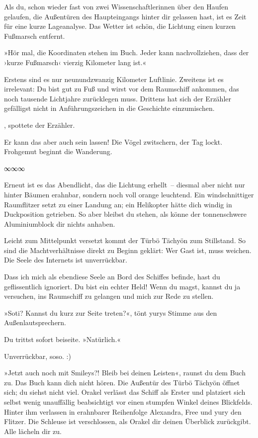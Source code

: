 Als du, schon wieder fast von zwei Wissenschaftlerinnen über den Haufen gelaufen, die Außentüren des Haupteingangs hinter dir gelassen hast, ist es Zeit für eine kurze Lageanalyse. Das Wetter ist schön, die Lichtung einen kurzen Fußmarsch entfernt.

»Hör mal, die Koordinaten stehen im Buch. Jeder kann nachvollziehen, dass der ›kurze Fußmarsch‹ vierzig Kilometer lang ist.«

Erstens sind es nur neunundzwanzig Kilometer Luftlinie. Zweitens ist es irrelevant: Du bist gut zu Fuß und wirst vor dem Raumschiff ankommen, das noch tausende Lichtjahre zurücklegen muss. Drittens hat sich der Erzähler gefälligst nicht in Anführungszeichen in die Geschichte einzumischen.

, spottete der Erzähler.

Er kann das aber auch sein lassen! Die Vögel zwitschern, der Tag lockt. Frohgemut beginnt die Wanderung.

\begin{center}
∞∞∞
\end{center}

Erneut ist es das Abendlicht, das die Lichtung erhellt~– diesmal aber nicht nur hinter Bäumen erahnbar, sondern noch voll orange leuchtend. Ein windschnittiger Raumflitzer setzt zu einer Landung an; ein Helikopter hätte dich windig in Duckposition getrieben. So aber bleibst du stehen, als könne der tonnenschwere Aluminiumblock dir nichts anhaben.

Leicht zum Mittelpunkt versetzt kommt der Türbö Tächyön zum Stillstand. So sind die Machtverhältnisse direkt zu Beginn geklärt: Wer Gast ist, muss weichen. Die Seele des Internets ist unverrückbar.

Dass ich mich als ebendiese Seele an Bord des Schiffes befinde, hast du geflissentlich ignoriert. Du bist ein echter Held! Wenn du magst, kannst du ja versuchen, ins Raumschiff zu gelangen und mich zur Rede zu stellen.

»Soti? Kannst du kurz zur Seite treten?«, tönt yurys Stimme aus den Außenlautsprechern.

Du trittst sofort beiseite. »Natürlich.«

Unverrückbar, soso. :)

»Jetzt auch noch mit Smileys?! Bleib bei deinen Leisten«, raunst du dem Buch zu. Das Buch kann dich nicht hören. Die Außentür des Türbö Tächyön öffnet sich; du siehst nicht viel. Orakel verlässt das Schiff als Erster und platziert sich selbst wenig unauffällig beabsichtigt vor einen stumpfen Winkel deines Blickfelds. Hinter ihm verlassen in erahnbarer Reihenfolge Alexandra, Free und yury den Flitzer. Die Schleuse ist verschlossen, als Orakel dir deinen Überblick zurückgibt. Alle lächeln dir zu.

